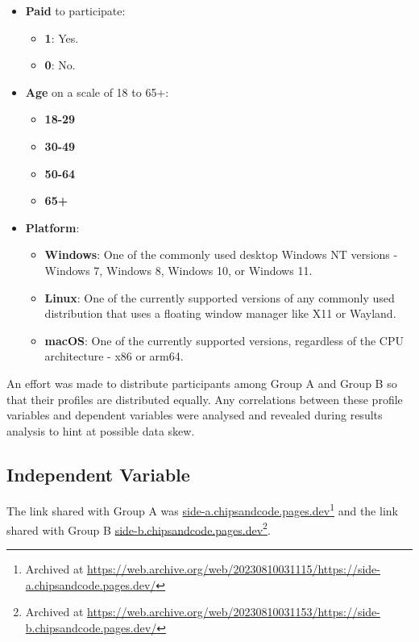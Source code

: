 \begin{itemize}
\begin{itemize}[]
    \end{itemize}
    \item \textbf{Paid} to participate:
    \begin{itemize}[]
        \item \textbf{1}: Yes.
        \item \textbf{0}: No.
    \end{itemize}
    \item \textbf{Age} on a scale of 18 to 65+:
    \begin{itemize}[]
        \item \textbf{18-29}
        \item \textbf{30-49}
        \item \textbf{50-64}
        \item \textbf{65+}
    \end{itemize}
    \item \textbf{Platform}:
    \begin{itemize}[]
        \item \textbf{Windows}: One of the commonly used desktop Windows NT versions - Windows 7, Windows 8, Windows 10, or Windows 11.
        \item \textbf{Linux}: One of the currently supported versions of any commonly used distribution that uses a floating window manager like X11 or Wayland.
        \item \textbf{macOS}: One of the currently supported versions, regardless of the CPU architecture - x86 or arm64.
    \end{itemize}
\end{itemize}

An effort was made to distribute participants among Group A and Group B so that their profiles are distributed equally.
Any correlations between these profile variables and dependent variables were analysed and revealed during results analysis to hint at possible data skew.

\subsection{Independent Variable}

The link shared with Group A was \href{https://side-a.chipsandcode.pages.dev/}{side-a.chipsandcode.pages.dev}\footnote{Archived at \url{https://web.archive.org/web/20230810031115/https://side-a.chipsandcode.pages.dev/}} and the link shared with Group B \href{https://side-b.chipsandcode.pages.dev/}{side-b.chipsandcode.pages.dev}\footnote{Archived at \url{https://web.archive.org/web/20230810031153/https://side-b.chipsandcode.pages.dev/}}.

